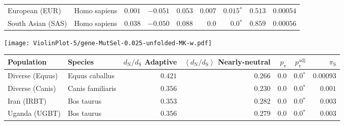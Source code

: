 \begin{center}
\begin{adjustbox}{width = 1\textwidth}
\begin{tabular}{|l|l|r|r|r|r|r|r|r|}
                 European (EUR) &         Homo sapiens &                                        $ 0.001$ &                                           $-0.051$ &                      $ 0.053$ &         $ 0.007$ &               $\bm{ 0.015{^*}}$ &                                           $ 0.513$ &          $0.00054$ \\
              South Asian (SAS) &         Homo sapiens &                                        $ 0.038$ &                                           $-0.050$ &                      $ 0.088$ &            $0.0$ &                  $\bm{0.0{^*}}$ &                                           $ 0.859$ &          $0.00056$ \\
\bottomrule
\end{tabular}
\end{adjustbox}
\newpage
\texttt{[image: ViolinPlot-5/gene-MutSel-0.025-unfolded-MK-w.pdf]} 
\begin{adjustbox}{width = 1\textwidth}
\begin{tabular}{|l|l|r|r|r|r|r|}
\toprule
                     Population &              Species & \specialcell{$d_{\mathrm{N}} / d_{\mathrm{S}}$ \\ Adaptive} & \specialcell{$\left< d_{\mathrm{N}} / d_{\mathrm{S}} \right>$ \\ Nearly-neutral} & $p_{\mathrm{v}}$ & $p_{\mathrm{v}}^{\mathrm{adj}}$ & $\pi_{\textrm{S}}$ \\
\midrule
                Diverse (Equus) &       Equus caballus &                                           $ 0.421$ &                                           $ 0.266$ &            $0.0$ &                  $\bm{0.0{^*}}$ &          $0.00093$ \\
                Diverse (Canis) &     Canis familiaris &                                           $ 0.356$ &                                           $ 0.230$ &            $0.0$ &                  $\bm{0.0{^*}}$ &           $ 0.001$ \\
                    Iran (IRBT) &           Bos taurus &                                           $ 0.353$ &                                           $ 0.282$ &            $0.0$ &                  $\bm{0.0{^*}}$ &           $ 0.003$ \\
                  Uganda (UGBT) &           Bos taurus &                                           $ 0.356$ &                                           $ 0.279$ &            $0.0$ &                  $\bm{0.0{^*}}$ &           $ 0.003$ \\

\end{tabular}
\end{adjustbox}
\end{center}
